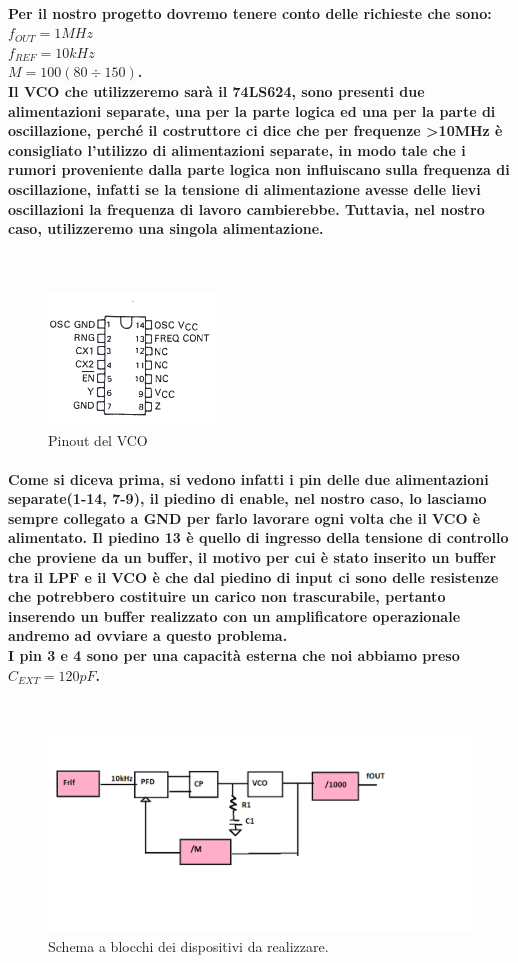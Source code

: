 \documentclass{article}
\begin{document}
\paragraph{Per il nostro progetto dovremo tenere conto delle richieste che sono:\\$f_{OUT}=1 MHz$\\$f_{REF}=10 kHz$\\$M=100 (80\div150)$.\\Il VCO che utilizzeremo sarà il 74LS624, sono presenti due alimentazioni separate, una per la parte logica ed una per la parte di oscillazione, perché il costruttore ci dice che per frequenze \textgreater 10MHz è consigliato l'utilizzo di alimentazioni separate, in modo tale che i rumori proveniente dalla parte logica non influiscano sulla frequenza di oscillazione, infatti se la tensione di alimentazione avesse delle lievi oscillazioni la frequenza di lavoro cambierebbe.
Tuttavia, nel nostro caso, utilizzeremo una singola alimentazione.}
~\begin{figure}[!h]%
\includegraphics[scale=1]{74LS.png} 
\centering
\caption{Pinout del VCO}
\label{fig:foo}
\end{figure}
\paragraph{Come si diceva prima, si vedono infatti i pin delle due alimentazioni separate(1-14, 7-9), il piedino di enable, nel nostro caso, lo lasciamo sempre collegato a GND per farlo lavorare ogni volta che il VCO è alimentato.
Il piedino 13 è quello di ingresso della tensione di controllo che proviene da un buffer, il motivo per cui è stato inserito un buffer tra il LPF e il VCO è che dal piedino di input ci sono delle resistenze che potrebbero costituire un carico non trascurabile, pertanto inserendo un buffer realizzato con un amplificatore operazionale andremo ad ovviare a questo problema.\\I pin 3 e 4 sono per una capacità esterna che noi abbiamo preso $C_{EXT}=120pF$.}
~\begin{figure}[!h]%
\includegraphics[scale=0.4]{SCH.png} 
\centering
\caption{Schema a blocchi dei dispositivi da realizzare.}
\label{fig:foo}
\end{figure}
\end{document}
